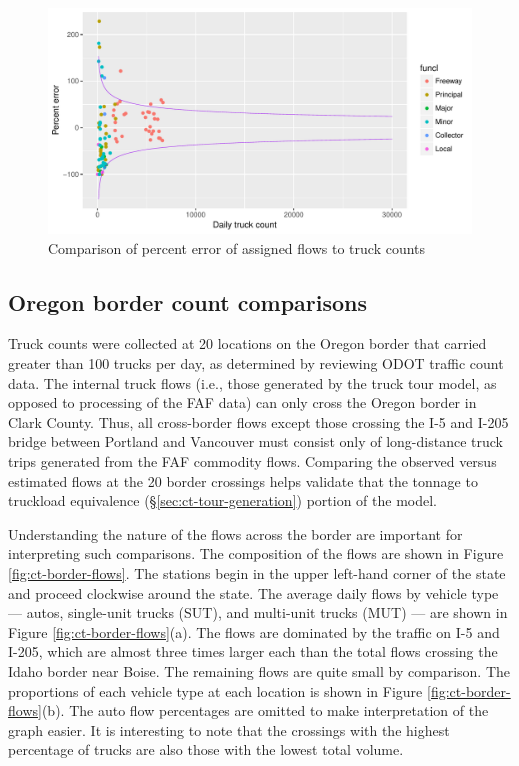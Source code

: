\begin{figure}
\centering
\includegraphics[width=6.5in]{ct/ct-validation-redux2.pdf}
\caption{Comparison of percent error of assigned flows to truck counts}
\label{fig:ct-mde-comparison}
\end{figure}

\subsection{Oregon border count comparisons}
Truck counts were collected at 20 locations on the Oregon border that carried greater than 100 trucks per day, as determined by reviewing ODOT traffic count data. The internal truck flows (i.e., those generated by the truck tour model, as opposed to processing of the FAF data) can only cross the Oregon border in Clark County. Thus, all cross-border flows except those crossing the I-5 and I-205 bridge between Portland and Vancouver must consist only of long-distance truck trips generated from the FAF commodity flows. Comparing the observed versus estimated flows at the 20 border crossings helps validate that the tonnage to truckload equivalence (\S\ref{sec:ct-tour-generation}) portion of the model.

Understanding the nature of the flows across the border are important for interpreting such comparisons. The composition of the flows are shown in Figure \ref{fig:ct-border-flows}. The stations begin in the upper left-hand corner of the state and proceed clockwise around the state. The average daily flows by vehicle type --- autos, single-unit trucks (SUT), and multi-unit trucks (MUT) --- are shown in Figure \ref{fig:ct-border-flows}(a). The flows are dominated by the traffic on I-5 and I-205, which are almost three times larger each than the total flows crossing the Idaho border near Boise. The remaining flows are quite small by comparison. The proportions of each vehicle type at each location is shown in Figure \ref{fig:ct-border-flows}(b). The auto flow percentages are omitted to make interpretation of the graph easier. It is interesting to note that the crossings with the highest percentage of trucks are also those with the lowest total volume. 

